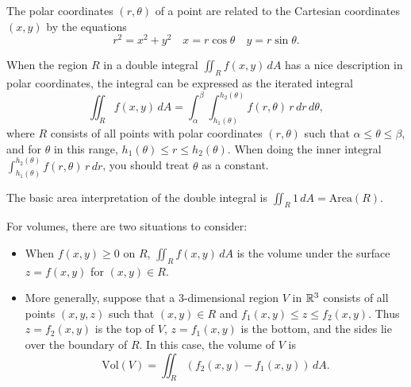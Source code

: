 \begin{fact}
	The polar coordinates $(r, \theta)$ of a point are related to the Cartesian
	coordinates $(x, y)$ by the equations
	\[
		r^2 = x^2 + y^2 \quad x = r \cos \theta \quad y = r \sin \theta.
	\]
\end{fact}

\begin{definition}
	When the region $R$ in a double integral $\iint_R f(x, y)\, dA$ has a nice
	description in polar coordinates, the integral can be expressed as the
	iterated integral
	\[
		\iint_R f(x, y)\, dA = \int_\alpha^\beta \int_{h_1(\theta)}^{h_2(\theta)}
		f(r, \theta)\, r\, dr\, d\theta,
	\]
	where $R$ consists of all points with polar coordinates $(r, \theta)$ such
	that $\alpha \leq \theta \leq \beta$, and for $\theta$ in this range,
	$h_1(\theta) \leq r \leq h_2(\theta)$. When doing the inner integral
	$\int_{h_1(\theta)}^{h_2(\theta)} f(r, \theta)\, r\, dr$, you should treat
	$\theta$ as a constant.
\end{definition}

\begin{definition}
	The basic area interpretation of the double integral is $\iint_R 1\, dA =
	\text{Area}(R)$.

	For volumes, there are two situations to consider:
	\begin{itemize}
		\item When $f(x, y) \geq 0$ on $R$, $\iint_R f(x, y)\, dA$ is the volume
			under the surface $z = f(x, y)$ for $(x, y) \in R$.
		\item More generally, suppose that a 3-dimensional region $V$ in ${\mathbb{R}}^3$
			consists of all points $(x, y, z)$ such that $(x, y) \in R$ and $f_1(x, y)
			\leq z \leq f_2(x, y)$. Thus $z = f_2(x, y)$ is the top of $V$, $z =
			f_1(x, y)$ is the bottom, and the sides lie over the boundary of $R$. In
			this case, the volume of $V$ is
			\[
				\text{Vol}(V) = \iint_R (f_2(x, y) - f_1(x, y))\, dA.
			\]
	\end{itemize}
\end{definition}

